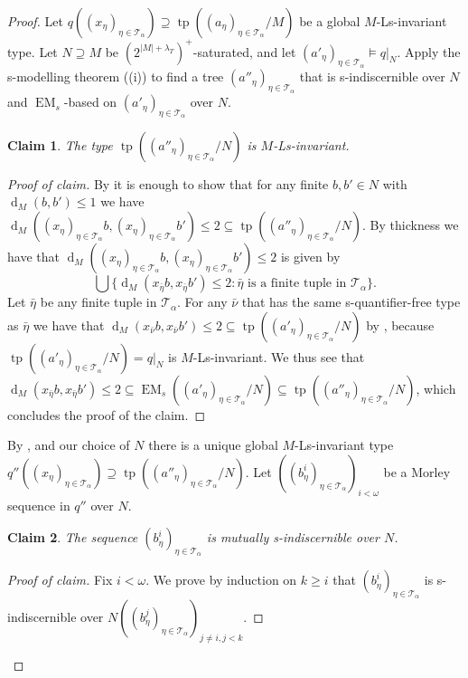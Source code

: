 \documentclass[a4paper, reqno]{amsart}
\newtheorem{claim}{Claim}[theorem]
\theoremstyle{definition}
\theoremstyle{repeat}
\newcommand{\T}{\mathcal{T}}
\DeclareMathOperator{\tp}{tp}
\renewcommand{\d}{\operatorname{d}}
\DeclareMathOperator{\EM}{EM}
\begin{document}
\begin{proof}
Let $q((x_\eta)_{\eta \in \T_\alpha}) \supseteq \tp((a_\eta)_{\eta \in \T_\alpha}/M)$ be a global $M$-Ls-invariant type. Let $N \supseteq M$ be $(2^{|M| + \lambda_T})^+$-saturated, and let $(a'_\eta)_{\eta \in \T_\alpha} \models q|_N$. Apply the s-modelling theorem ((i)) to find a tree $(a''_\eta)_{\eta \in \T_\alpha}$ that is s-indiscernible over $N$ and $\EM_s$-based on $(a'_\eta)_{\eta \in \T_\alpha}$ over $N$.
\begin{claim}
The type $\tp((a''_\eta)_{\eta \in \T_\alpha}/N)$ is $M$-Ls-invariant.
\end{claim}
\begin{proof}[Proof of claim]
By  it is enough to show that for any finite $b,b' \in N$ with $\d_M(b, b') \leq 1$ we have $\d_M((x_\eta)_{\eta \in \T_\alpha} b, (x_\eta)_{\eta \in \T_\alpha} b') \leq 2 \subseteq \tp((a''_\eta)_{\eta \in \T_\alpha}/N)$. By thickness we have that $\d_M((x_\eta)_{\eta \in \T_\alpha} b, (x_\eta)_{\eta \in \T_\alpha} b') \leq 2$ is given by
\[
\bigcup \{ \d_M(x_{\bar{\eta}} b, x_{\bar{\eta}} b') \leq 2 : \bar{\eta} \text{ is a finite tuple in } \T_\alpha \}.
\]
Let $\bar{\eta}$ be any finite tuple in $\T_\alpha$. For any $\bar{\nu}$ that has the same s-quantifier-free type as $\bar{\eta}$ we have that $\d_M(x_{\bar{\nu}} b, x_{\bar{\nu}} b') \leq 2 \subseteq \tp((a'_\eta)_{\eta \in \T_\alpha}/N)$ by , because $\tp((a'_\eta)_{\eta \in \T_\alpha}/N) = q|_N$ is $M$-Ls-invariant. We thus see that $\d_M(x_{\bar{\eta}} b, x_{\bar{\eta}} b') \leq 2 \subseteq \EM_s((a'_\eta)_{\eta \in \T_\alpha}/N) \subseteq \tp((a''_\eta)_{\eta \in \T_\alpha}/N)$, which concludes the proof of the claim.
\end{proof}
By ,  and our choice of $N$ there is a unique global $M$-Ls-invariant type $q''((x_\eta)_{\eta \in \T_\alpha}) \supseteq \tp((a''_\eta)_{\eta \in \T_\alpha}/N)$. Let $((b^i_\eta)_{\eta \in \T_\alpha})_{i < \omega}$ be a Morley sequence in $q''$ over $N$.
\begin{claim}
The sequence $(b^i_\eta)_{\eta \in \T_\alpha}$ is mutually s-indiscernible over $N$.
\end{claim}
\begin{proof}[Proof of claim]
Fix $i < \omega$. We prove by induction on $k \geq i$ that $(b^i_\eta)_{\eta \in \T_\alpha}$ is s-indiscernible over $N((b^j_\eta)_{\eta \in \T_\alpha})_{j \neq i, j < k}$.


\end{proof}
\end{proof}
\end{document}
